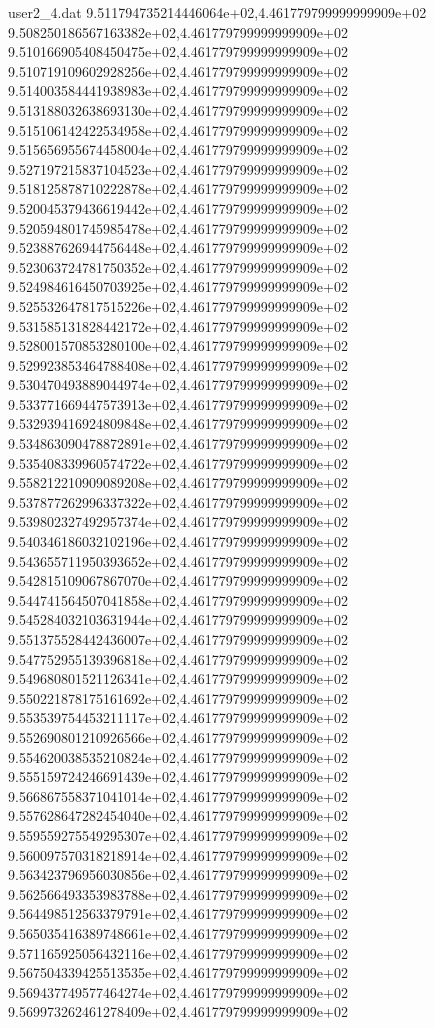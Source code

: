 \begin{filecontents}{user2_4.dat}
9.511794735214446064e+02,4.461779799999999909e+02
9.508250186567163382e+02,4.461779799999999909e+02
9.510166905408450475e+02,4.461779799999999909e+02
9.510719109602928256e+02,4.461779799999999909e+02
9.514003584441938983e+02,4.461779799999999909e+02
9.513188032638693130e+02,4.461779799999999909e+02
9.515106142422534958e+02,4.461779799999999909e+02
9.515656955674458004e+02,4.461779799999999909e+02
9.527197215837104523e+02,4.461779799999999909e+02
9.518125878710222878e+02,4.461779799999999909e+02
9.520045379436619442e+02,4.461779799999999909e+02
9.520594801745985478e+02,4.461779799999999909e+02
9.523887626944756448e+02,4.461779799999999909e+02
9.523063724781750352e+02,4.461779799999999909e+02
9.524984616450703925e+02,4.461779799999999909e+02
9.525532647817515226e+02,4.461779799999999909e+02
9.531585131828442172e+02,4.461779799999999909e+02
9.528001570853280100e+02,4.461779799999999909e+02
9.529923853464788408e+02,4.461779799999999909e+02
9.530470493889044974e+02,4.461779799999999909e+02
9.533771669447573913e+02,4.461779799999999909e+02
9.532939416924809848e+02,4.461779799999999909e+02
9.534863090478872891e+02,4.461779799999999909e+02
9.535408339960574722e+02,4.461779799999999909e+02
9.558212210909089208e+02,4.461779799999999909e+02
9.537877262996337322e+02,4.461779799999999909e+02
9.539802327492957374e+02,4.461779799999999909e+02
9.540346186032102196e+02,4.461779799999999909e+02
9.543655711950393652e+02,4.461779799999999909e+02
9.542815109067867070e+02,4.461779799999999909e+02
9.544741564507041858e+02,4.461779799999999909e+02
9.545284032103631944e+02,4.461779799999999909e+02
9.551375528442436007e+02,4.461779799999999909e+02
9.547752955139396818e+02,4.461779799999999909e+02
9.549680801521126341e+02,4.461779799999999909e+02
9.550221878175161692e+02,4.461779799999999909e+02
9.553539754453211117e+02,4.461779799999999909e+02
9.552690801210926566e+02,4.461779799999999909e+02
9.554620038535210824e+02,4.461779799999999909e+02
9.555159724246691439e+02,4.461779799999999909e+02
9.566867558371041014e+02,4.461779799999999909e+02
9.557628647282454040e+02,4.461779799999999909e+02
9.559559275549295307e+02,4.461779799999999909e+02
9.560097570318218914e+02,4.461779799999999909e+02
9.563423796956030856e+02,4.461779799999999909e+02
9.562566493353983788e+02,4.461779799999999909e+02
9.564498512563379791e+02,4.461779799999999909e+02
9.565035416389748661e+02,4.461779799999999909e+02
9.571165925056432116e+02,4.461779799999999909e+02
9.567504339425513535e+02,4.461779799999999909e+02
9.569437749577464274e+02,4.461779799999999909e+02
9.569973262461278409e+02,4.461779799999999909e+02

\end{filecontents}
